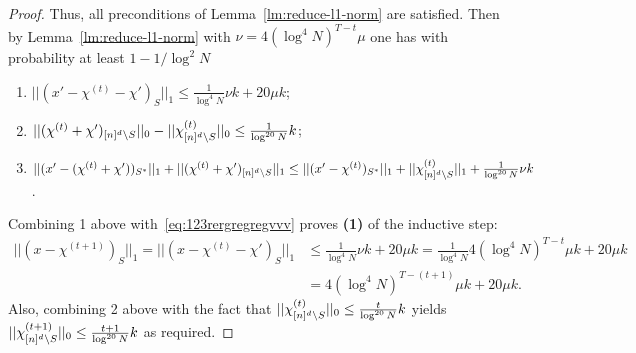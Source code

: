 \begin{proof}
Thus, all preconditions of Lemma~\ref{lm:reduce-l1-norm} are satisfied. Then by Lemma~\ref{lm:reduce-l1-norm} with $\nu=4(\log^4 N)^{T-t} \mu$
one has with probability at least $1-1/\log^2 N$

\begin{enumerate}
\item $||(x'-\chi^{(t)}-\chi')_S||_1\leq \frac1{\log^4 N}\nu k+20\mu k$;
\item $||(\chi^{(t)}+\chi')_{{[n]^d}\setminus S}||_0-||\chi^{(t)}_{{[n]^d}\setminus S}||_0\leq \frac1{\log^{20} N}k$;
\item $||(x'-(\chi^{(t)}+\chi'))_{S^*}||_1+||(\chi^{(t)}+\chi')_{{[n]^d}\setminus S}||_1\leq ||(x'-\chi^{(t)})_{S^*}||_1+||\chi^{(t)}_{{[n]^d}\setminus S}||_1+\frac1{\log^{20} N}\nu k$.
\end{enumerate}
Combining 1 above with~\eqref{eq:123rergregregvvv} proves {\bf (1)} of the inductive step:
\begin{equation*}
\begin{split}
||(x-\chi^{(t+1)})_S||_1=||(x-\chi^{(t)}-\chi')_S||_1&\leq \frac1{\log^4 N}\nu k+20\mu k=\frac1{\log^4 N}4(\log^4 N)^{T-t} \mu k+20\mu k\\
&=4(\log^4 N)^{T-(t+1)} \mu k+20\mu k.
\end{split}
\end{equation*}
 Also, combining 2 above with the fact that $||\chi^{(t)}_{{[n]^d}\setminus S}||_0\leq \frac{t}{\log^{20} N} k$ yields $||\chi^{(t+1)}_{{[n]^d}\setminus S}||_0\leq \frac{t+1}{\log^{20} N} k$ as required.


\end{proof}
